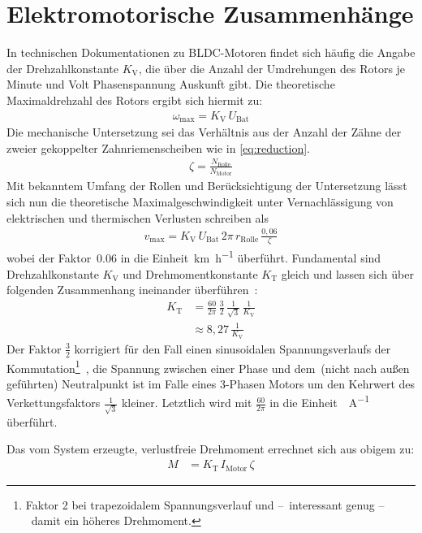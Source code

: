 	\section{Elektromotorische Zusammenhänge}
		In technischen Dokumentationen zu BLDC-Motoren findet sich häufig die Angabe der Drehzahlkonstante \(K_\text{V}\), die über die Anzahl der Umdrehungen des Rotors je Minute und Volt Phasenspannung Auskunft gibt.
		Die theoretische Maximaldrehzahl des Rotors ergibt sich hiermit zu:
		\begin{align}
			\omega_\text{max} = K_\text{V} \, U_\text{Bat}
			\label{eq:max rpm}
		\end{align}%
		Die mechanische Untersetzung sei das Verhältnis aus der Anzahl der Zähne der zweier gekoppelter Zahnriemenscheiben wie in \cref{eq:reduction}.
		\begin{align}
			\zeta = \frac{N_\text{Rolle}}{N_\text{Motor}}
			\label{eq:reduction}
		\end{align}%
		Mit bekanntem Umfang der Rollen und Berücksichtigung der Untersetzung lässt sich nun die theoretische Maximalgeschwindigkeit unter Vernachlässigung von elektrischen und thermischen Verlusten schreiben als
		\begin{align}
			v_\text{max} = K_\text{V} \, U_\text{Bat} \, 2\pi \, r_\text{Rolle} \, \frac{0,06}{\zeta}
			\label{eq:max speed km h}
		\end{align}%
		wobei der Faktor~\num{0,06} in  die Einheit~\unit{\kilo\metre\per\hour} überführt.
		Fundamental sind Drehzahlkonstante \(K_\text{V}\) und Drehmomentkonstante \(K_\text{T}\) gleich und lassen sich über folgenden Zusammenhang ineinander überführen~\cites{mevey2009sensorless}{DalY.Ohm.2000}{AN885.BLDC.fundamentals}:
		\begin{align}
			K_\text{T}	&= \frac{60}{2\pi} \, \frac{3}{2} \, \frac{1}{\sqrt{3}} \, \frac{1}{K_\text{V}} \nonumber \\
				&\approx 8,27 \, \frac{1}{K_\text{V}}
			\label{eq:kv to kt}
		\end{align}%
		Der Faktor \(\frac{3}{2}\) korrigiert für den Fall einen sinusoidalen Spannungsverlaufs der Kommutation\footnote{\hspace{1mm}Faktor 2 bei trapezoidalem Spannungsverlauf und --~interessant genug --~damit ein höheres Drehmoment.}~\cites{mevey2009sensorless}{DalY.Ohm.2000}, die Spannung zwischen einer Phase und dem~(nicht nach außen geführten) Neutralpunkt ist im Falle eines 3-Phasen Motors um den Kehrwert des Verkettungsfaktors \(\frac{1}{\sqrt{3}}\) kleiner.
		Letztlich wird mit \(\frac{60}{2\pi}\) in die Einheit~\unit{\newtonmetre\per\ampere} überführt.\par\medskip
		Das vom System erzeugte, verlustfreie Drehmoment errechnet sich aus obigem zu:
		\begin{align}
			M	&= K_\text{T} \, I_\text{Motor} \, \zeta
			\label{eq:frictionless torque}
		\end{align}%
		\nocite{Meschede.2015}\nocite{Demtroder.2018}